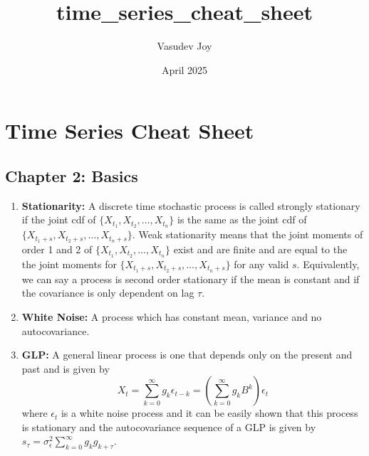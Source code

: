 \documentclass{article}
\title{time_series_cheat_sheet}
\author{Vasudev Joy}
\date{April 2025}
\begin{document}
\section*{Time Series Cheat Sheet}

\subsection*{Chapter 2: Basics}

\begin{enumerate}
    \item \textbf{Stationarity:} A discrete time stochastic process is called strongly stationary if the joint cdf of \(\{X_{t_1}, X_{t_2}, \dots,X_{t_n}\}\) is the same as the joint cdf of \(\{X_{t_1 + s}, X_{t_2+s}, \dots,X_{t_n+s}\}\). Weak stationarity means that the joint moments of order 1 and 2 of \(\{X_{t_1}, X_{t_2}, \dots,X_{t_n}\}\) exist and are finite and are equal to the the joint moments for \(\{X_{t_1 + s}, X_{t_2+s}, \dots,X_{t_n+s}\}\) for any valid \(s\). Equivalently, we can say a process is second order stationary if the mean is constant and if the covariance is only dependent on lag \(\tau\).

    \item \textbf{White Noise:} A process which has constant mean, variance and no autocovariance.

    \item \textbf{GLP:} A general linear process is one that depends only on the present and past and is given by
    \[
    X_t = \sum_{k=0}^{\infty} g_k \epsilon_{t-k} = \left(\sum_{k=0}^{\infty} g_k B^{k}\right)\epsilon_{t} 
    \]
    where \(\epsilon_t\) is a white noise process and it can be easily shown that this process is stationary and the autocovariance sequence of a GLP is given by \(s_\tau = \sigma_\epsilon^2 \sum_{k=0}^{\infty}g_k g_{k+\tau}\).


\end{enumerate}
\end{document}

